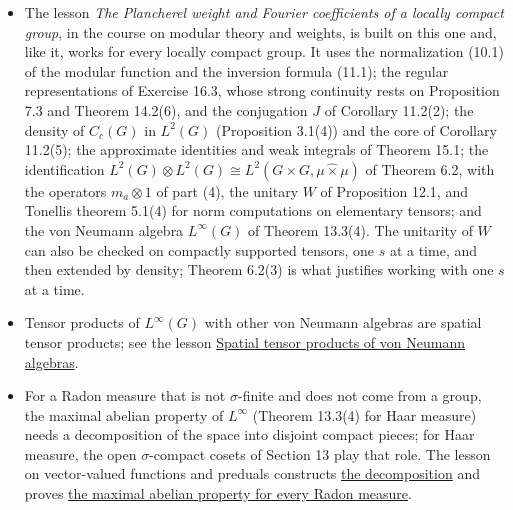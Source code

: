 \documentclass[
  english,
  11pt,
  a4paper,
]{article}
\providecommand{\tightlist}{%
  \setlength{\itemsep}{0pt}\setlength{\parskip}{0pt}}
\begin{document}
\begin{itemize}
\tightlist
\item
  The lesson \emph{The Plancherel weight and Fourier coefficients of a
  locally compact group}, in the course on modular theory and weights,
  is built on this one and, like it, works for every locally compact
  group. It uses the normalization (10.1) of the modular function and
  the inversion formula (11.1); the regular representations of Exercise
  16.3, whose strong continuity rests on Proposition 7.3 and Theorem
  14.2(6), and the conjugation \(J\) of Corollary 11.2(2); the density
  of \(C_c(G)\) in \(L^2(G)\) (Proposition 3.1(4)) and the core of
  Corollary 11.2(5); the approximate identities and weak integrals of
  Theorem 15.1; the identification
  \(L^2(G)\otimes L^2(G)\cong L^2(G\times G,\mu\hat\times\mu)\) of
  Theorem 6.2, with the operators \(m_a\otimes1\) of part (4), the
  unitary \(W\) of Proposition 12.1, and Tonelli\textquotesingle s
  theorem 5.1(4) for norm computations on elementary tensors; and the
  von Neumann algebra \(L^\infty(G)\) of Theorem 13.3(4). The unitarity
  of \(W\) can also be checked on compactly supported tensors, one \(s\)
  at a time, and then extended by density; Theorem 6.2(3) is what
  justifies working with one \(s\) at a time.
\item
  Tensor products of \(L^\infty(G)\) with other von Neumann algebras are
  spatial tensor products; see the lesson
  \href{https://kokunoyumeto.github.io/open-math-courses/courses/harmonic-analysis-on-locally-compact-groups/reader/programme-reading.html\#ref-c4b6f64f97d8c007}{Spatial
  tensor products of von Neumann algebras}.
\item
  For a Radon measure that is not \(\sigma\)-finite and does not come
  from a group, the maximal abelian property of \(L^\infty\) (Theorem
  13.3(4) for Haar measure) needs a decomposition of the space into
  disjoint compact pieces; for Haar measure, the open \(\sigma\)-compact
  cosets of Section 13 play that role. The lesson on vector-valued
  functions and preduals constructs
  \href{https://kokunoyumeto.github.io/open-math-courses/courses/harmonic-analysis-on-locally-compact-groups/reader/programme-reading.html\#ref-ca782bdbcbfeedb9}{the
  decomposition} and proves
  \href{https://kokunoyumeto.github.io/open-math-courses/courses/harmonic-analysis-on-locally-compact-groups/reader/programme-reading.html\#ref-ca782bdbcbfeedb9}{the
  maximal abelian property for every Radon measure}.
\end{itemize}
\end{document}
